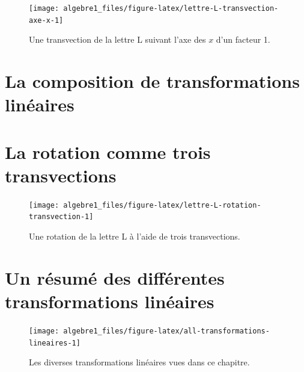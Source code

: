 \documentclass[]{book}
\theoremstyle{definition}
\theoremstyle{definition}
\theoremstyle{definition}
\theoremstyle{remark}
\begin{document}
\begin{figure}

{\centering \texttt{[image: algebre1\_files/figure-latex/lettre-L-transvection-axe-x-1]} 

}

\caption{Une transvection de la lettre L suivant l'axe des $x$ d'un facteur 1.}\label{fig:lettre-L-transvection-axe-x}
\end{figure}

\hypertarget{la-composition-de-transformations-linuxe9aires}{%
\section{La composition de transformations linéaires}\label{la-composition-de-transformations-linuxe9aires}}

\hypertarget{la-rotation-comme-trois-transvections}{%
\section{La rotation comme trois transvections}\label{la-rotation-comme-trois-transvections}}

\begin{figure}

{\centering \texttt{[image: algebre1\_files/figure-latex/lettre-L-rotation-transvection-1]} 

}

\caption{Une rotation de la lettre L à l'aide de trois transvections.}\label{fig:lettre-L-rotation-transvection}
\end{figure}

\hypertarget{un-ruxe9sumuxe9-des-diffuxe9rentes-transformations-linuxe9aires}{%
\section{Un résumé des différentes transformations linéaires}\label{un-ruxe9sumuxe9-des-diffuxe9rentes-transformations-linuxe9aires}}

\begin{figure}

{\centering \texttt{[image: algebre1\_files/figure-latex/all-transformations-lineaires-1]} 

}

\caption{Les diverses transformations linéaires vues dans ce chapitre.}\label{fig:all-transformations-lineaires}
\end{figure}


\end{document}
